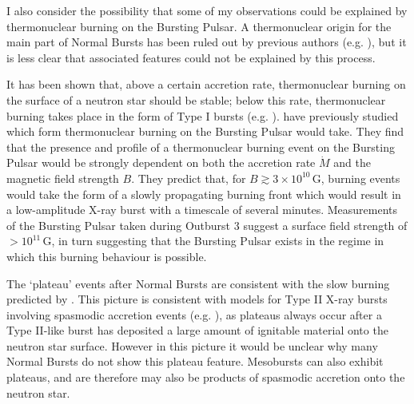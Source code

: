 \par I also consider the possibility that some of my observations could be explained by thermonuclear burning on the Bursting Pulsar.  A thermonuclear origin for the main part of Normal Bursts has been ruled out by previous authors (e.g. \citealp{Lewin_BP}), but it is less clear that associated features could not be explained by this process.
\par It has been shown that, above a certain accretion rate, thermonuclear burning on the surface of a neutron star should be stable; below this rate, thermonuclear burning takes place in the form of Type I bursts (e.g. \citealp{Fujimoto_Shellstab,Bildsten_Regimes}).  \citet{Bildsten_Nuclear} have previously studied which form thermonuclear burning on the Bursting Pulsar would take.  They find that the presence and profile of a thermonuclear burning event on the Bursting Pulsar would be strongly dependent on both the accretion rate $\dot{M}$ and the magnetic field strength $B$.  They predict that, for $B\gtrsim3\times10^{10}$\,G, burning events would take the form of a slowly propagating burning front which would result in a low-amplitude X-ray burst with a timescale of several minutes.  Measurements of the Bursting Pulsar taken during Outburst 3 suggest a surface field strength of $>10^{11}$\,G, in turn suggesting that the Bursting Pulsar exists in the regime in which this burning behaviour is possible.
\par The `plateau' events after Normal Bursts are consistent with the slow burning predicted by \citet{Bildsten_Nuclear}.  This picture is consistent with models for Type II X-ray bursts involving spasmodic accretion events (e.g. \citealp{Spruit_Type2Mod,Walker_Type2Mod}), as plateaus always occur after a Type II-like burst has deposited a large amount of ignitable material onto the neutron star surface.  However in this picture it would be unclear why many Normal Bursts do not show this plateau feature.  Mesobursts can also exhibit plateaus, and are therefore may also be products of spasmodic accretion onto the neutron star.
